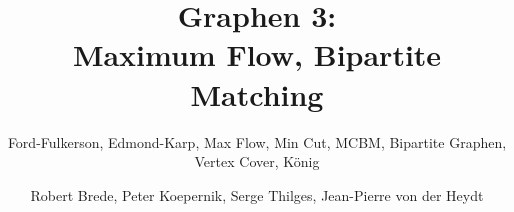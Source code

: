 \documentclass[18pt, hideallsubsections, handout]{beamer}
\title[Graphen III]{Graphen 3:\\ Maximum Flow, Bipartite Matching}
\subtitle{Ford-Fulkerson, Edmond-Karp, Max Flow, Min Cut, MCBM, Bipartite Graphen, Vertex Cover, König}
\author{Robert Brede, Peter Koepernik, Serge Thilges, Jean-Pierre von der Heydt}
\institute{Basispraktikum zum ICPC Programmierwettbewerb}
\begin{document}

\begin{frame}
\titlepage
\end{frame}







\appendix


\end{document}
